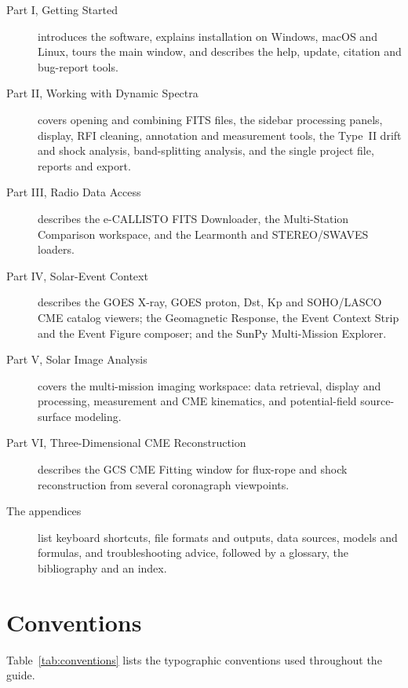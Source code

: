 \begin{description}
  \item[Part I, Getting Started] introduces the software, explains installation on
    Windows, macOS and Linux, tours the main window, and describes the help, update,
    citation and bug-report tools.
  \item[Part II, Working with Dynamic Spectra] covers opening and combining FITS files, the
    sidebar processing panels, display, RFI cleaning, annotation and measurement tools,
    the Type~II drift and shock analysis, band-splitting analysis, and the single project
    file, reports and export.
  \item[Part III, Radio Data Access] describes the e-CALLISTO FITS Downloader, the
    Multi-Station Comparison workspace, and the Learmonth and STEREO/SWAVES loaders.
  \item[Part IV, Solar-Event Context] describes the GOES X-ray, GOES proton, Dst, Kp and
    SOHO/LASCO CME catalog viewers; the Geomagnetic Response, the Event Context Strip and the
    Event Figure composer; and the SunPy Multi-Mission Explorer.
  \item[Part V, Solar Image Analysis] covers the multi-mission imaging workspace: data
    retrieval, display and processing, measurement and CME kinematics, and potential-field
    source-surface modeling.
  \item[Part VI, Three-Dimensional CME Reconstruction] describes the GCS CME Fitting window
    for flux-rope and shock reconstruction from several coronagraph viewpoints.
  \item[The appendices] list keyboard shortcuts, file formats and outputs, data sources,
    models and formulas, and troubleshooting advice, followed by a glossary, the
    bibliography and an index.
\end{description}

\section*{Conventions}

Table~\ref{tab:conventions} lists the typographic conventions used throughout the guide.


